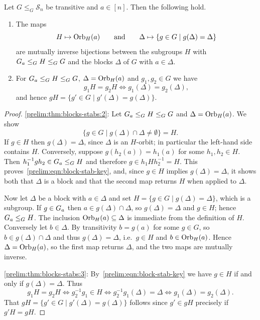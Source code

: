 \begin{theorem}\label{prelim:thm:blocks-stabs}
	Let $G \le_G \mathcal S_n$ be transitive and $a \in [n]$. Then the following hold.
	\begin{enumerate}
		\item \label{prelim:thm:blocks-stabs:2} The maps
		\[
		H \mapsto \Orbit{a}{H}
		\qquad\text{and}\qquad
		\Delta \mapsto \{ g \in G \mid g(\Delta) = \Delta \}
		\]
		are mutually inverse bijections between the subgroups $H$ with $\Stab{a}{G} \le_G H \le_G G$
		and the blocks $\Delta$ of $G$ with $a \in \Delta$.
		
		\item \label{prelim:thm:blocks-stabs:3} For $\Stab{a}{G} \le_G H \le_G G$,
		$\Delta = \Orbit{a}{H}$ and $g_1,g_2 \in G$ we have
		\[
		g_1 H = g_2 H \iff g_1(\Delta) = g_2(\Delta),
		\]
		and hence $gH = \{ g' \in G \mid g'(\Delta) = g(\Delta) \}$.
	\end{enumerate}
\end{theorem}
\begin{proof}
	\ref{prelim:thm:blocks-stabs:2}:
	Let $\Stab{a}{G} \le_G H \le_G G$ and $\Delta = \Orbit{a}{H}$.
	We show
	\begin{equation}\label{prelim:eqn:block-stab-key}
		\{ g \in G \mid g(\Delta) \cap \Delta \ne \emptyset \} = H .
	\end{equation}
	If $g \in H$ then $g(\Delta) = \Delta$, since $\Delta$ is an $H$-orbit; in particular the
	left-hand side contains $H$.
	Conversely, suppose $g(h_2(a)) = h_1(a)$ for some $h_1,h_2 \in H$.
	Then $h_1^{-1} g h_2 \in \Stab{a}{G} \le_G H$ and therefore $g \in h_1 H h_2^{-1} = H$.
	This proves~\eqref{prelim:eqn:block-stab-key}, and, since $g \in H$ implies $g(\Delta) = \Delta$,
	it shows both that $\Delta$ is a block and that the second map returns $H$ when applied to $\Delta$.
	
	Now let $\Delta$ be a block with $a \in \Delta$ and set $H = \{ g \in G \mid g(\Delta) = \Delta \}$,
	which is a subgroup.
	If $g \in \Stab{a}{G}$ then $a \in g(\Delta) \cap \Delta$, so $g(\Delta) = \Delta$ and $g \in H$;
	hence $\Stab{a}{G} \le_G H$.
	The inclusion $\Orbit{a}{H} \subseteq \Delta$ is immediate from the definition of $H$.
	Conversely let $b \in \Delta$. By transitivity $b = g(a)$ for some $g \in G$, so
	$b \in g(\Delta) \cap \Delta$ and thus $g(\Delta) = \Delta$, i.e.\ $g \in H$ and $b \in \Orbit{a}{H}$.
	Hence $\Delta = \Orbit{a}{H}$, so the first map returns $\Delta$, and the two maps are
	mutually inverse.
	
	\ref{prelim:thm:blocks-stabs:3}:
	By~\eqref{prelim:eqn:block-stab-key} we have $g \in H$ if and only if $g(\Delta) = \Delta$. Thus
	\[
	g_1 H = g_2 H
	\iff g_2^{-1} g_1 \in H
	\iff g_2^{-1} g_1 (\Delta) = \Delta
	\iff g_1(\Delta) = g_2(\Delta).
	\]
	That $gH = \{ g' \in G \mid g'(\Delta) = g(\Delta) \}$
	follows since $g' \in gH$ precisely if $g'H = gH$.
\end{proof}

